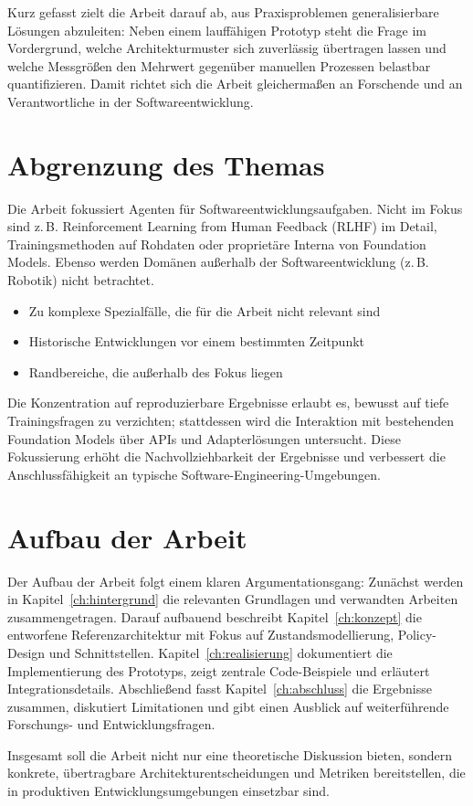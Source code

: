 Kurz gefasst zielt die Arbeit darauf ab, aus Praxisproblemen generalisierbare Lösungen abzuleiten: Neben einem lauffähigen Prototyp steht die Frage im Vordergrund, welche Architekturmuster sich zuverlässig übertragen lassen und welche Messgrößen den Mehrwert gegenüber manuellen Prozessen belastbar quantifizieren. Damit richtet sich die Arbeit gleichermaßen an Forschende und an Verantwortliche in der Softwareentwicklung.
\section{Abgrenzung des Themas}

Die Arbeit fokussiert Agenten für Softwareentwicklungsaufgaben. Nicht im Fokus sind z.\,B. Reinforcement Learning from Human Feedback (RLHF) im Detail, Trainingsmethoden auf Rohdaten oder proprietäre Interna von Foundation Models. Ebenso werden Domänen außerhalb der Softwareentwicklung (z.\,B. Robotik) nicht betrachtet.

\begin{itemize}
  \item Zu komplexe Spezialfälle, die für die Arbeit nicht relevant sind
  \item Historische Entwicklungen vor einem bestimmten Zeitpunkt
  \item Randbereiche, die außerhalb des Fokus liegen
\end{itemize}
 
Die Konzentration auf reproduzierbare Ergebnisse erlaubt es, bewusst auf tiefe Trainingsfragen zu verzichten; stattdessen wird die Interaktion mit bestehenden Foundation Models über APIs und Adapterlösungen untersucht. Diese Fokussierung erhöht die Nachvollziehbarkeit der Ergebnisse und verbessert die Anschlussfähigkeit an typische Software-Engineering-Umgebungen.
\section{Aufbau der Arbeit}

Der Aufbau der Arbeit folgt einem klaren Argumentationsgang: Zunächst werden in Kapitel~\ref{ch:hintergrund} die relevanten Grundlagen und verwandten Arbeiten zusammengetragen. Darauf aufbauend beschreibt Kapitel~\ref{ch:konzept} die entworfene Referenzarchitektur mit Fokus auf Zustandsmodellierung, Policy-Design und Schnittstellen. Kapitel~\ref{ch:realisierung} dokumentiert die Implementierung des Prototyps, zeigt zentrale Code-Beispiele und erläutert Integrationsdetails. Abschließend fasst Kapitel~\ref{ch:abschluss} die Ergebnisse zusammen, diskutiert Limitationen und gibt einen Ausblick auf weiterführende Forschungs- und Entwicklungsfragen.

Insgesamt soll die Arbeit nicht nur eine theoretische Diskussion bieten, sondern konkrete, übertragbare Architekturentscheidungen und Metriken bereitstellen, die in produktiven Entwicklungsumgebungen einsetzbar sind.
